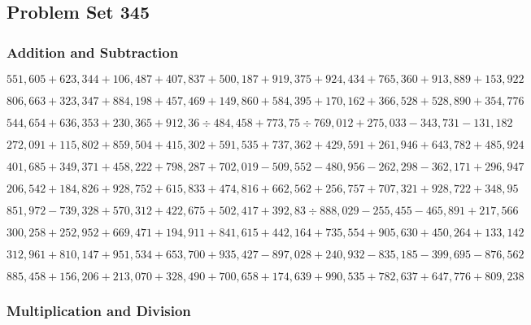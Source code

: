 \hypertarget{problem-set-345}{%
\subsection{Problem Set 345}\label{problem-set-345}}

\hypertarget{addition-and-subtraction}{%
\subsubsection{Addition and
Subtraction}\label{addition-and-subtraction}}

\(551,605+623,344+106,487+407,837+500,187+919,375+924,434+765,360+913,889+153,922\)

\(806,663+323,347+884,198+457,469+149,860+584,395+170,162+366,528+528,890+354,776\)

\(544,654+636,353+230,365+912,36÷484,458+773,75÷769,012+275,033-343,731-131,182\)

\(272,091+115,802+859,504+415,302+591,535+737,362+429,591+261,946+643,782+485,924\)

\(401,685+349,371+458,222+798,287+702,019-509,552-480,956-262,298-362,171+296,947\)

\(206,542+184,826+928,752+615,833+474,816+662,562+256,757+707,321+928,722+348,95\)

\(851,972-739,328+570,312+422,675+502,417+392,83÷888,029-255,455-465,891+217,566\)

\(300,258+252,952+669,471+194,911+841,615+442,164+735,554+905,630+450,264+133,142\)

\(312,961+810,147+951,534+653,700+935,427-897,028+240,932-835,185-399,695-876,562\)

\(885,458+156,206+213,070+328,490+700,658+174,639+990,535+782,637+647,776+809,238\)

\hypertarget{multiplication-and-division}{%
\subsubsection{Multiplication and
Division}\label{multiplication-and-division}}

